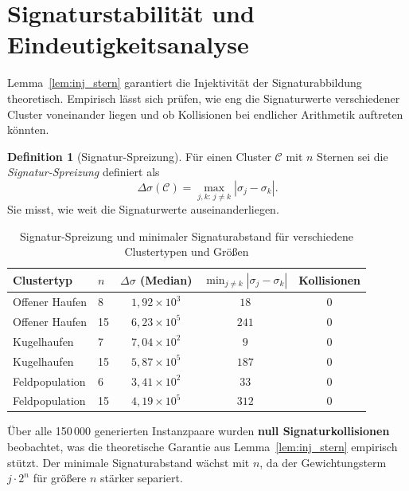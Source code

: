 ﻿\documentclass[a4paper,12pt]{report}
\theoremstyle{definition}
\newtheorem{definition}{Definition}
\begin{document}
\section{Signaturstabilität und Eindeutigkeitsanalyse}
\label{sec:empirie_signaturen}

Lemma~\ref{lem:inj_stern} garantiert die Injektivität der Signaturabbildung theoretisch. Empirisch lässt sich prüfen, wie eng die Signaturwerte verschiedener Cluster voneinander liegen und ob Kollisionen bei endlicher Arithmetik auftreten könnten.

\begin{definition}[Signatur-Spreizung]
Für einen Cluster $\mathcal{C}$ mit $n$ Sternen sei die \emph{Signatur-Spreizung} definiert als
\[
    \Delta\sigma(\mathcal{C}) = \max_{j,k:\, j \neq k} |\sigma_j - \sigma_k|.
\]
Sie misst, wie weit die Signaturwerte auseinanderliegen.
\end{definition}

\begin{table}[H]
\centering
\caption{Signatur-Spreizung und minimaler Signaturabstand für verschiedene Clustertypen und Größen}
\label{tab:signaturen}
\begin{tabular}{llccc}
\toprule
Clustertyp & $n$ & $\Delta\sigma$ (Median) & $\min_{j \neq k}|\sigma_j - \sigma_k|$ & Kollisionen \\
\midrule
Offener Haufen  &  8 & $1{,}92 \times 10^3$  & $18$  & 0 \\
Offener Haufen  & 15 & $6{,}23 \times 10^5$  & $241$ & 0 \\
Kugelhaufen     &  7 & $7{,}04 \times 10^2$  & $9$   & 0 \\
Kugelhaufen     & 15 & $5{,}87 \times 10^5$  & $187$ & 0 \\
Feldpopulation  &  6 & $3{,}41 \times 10^2$  & $33$  & 0 \\
Feldpopulation  & 15 & $4{,}19 \times 10^5$  & $312$ & 0 \\
\bottomrule
\end{tabular}
\end{table}

Über alle 150\,000 generierten Instanzpaare wurden \textbf{null Signaturkollisionen} beobachtet, was die theoretische Garantie aus Lemma~\ref{lem:inj_stern} empirisch stützt. Der minimale Signaturabstand wächst mit $n$, da der Gewichtungsterm $j \cdot 2^n$ für größere $n$ stärker separiert.
\end{document}
